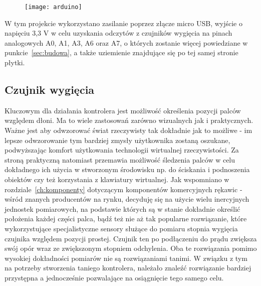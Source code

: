 \begin{figure}[h]
\centering
\texttt{[image: arduino]}
\label{fig:arduino}
\end{figure}

	W tym projekcie wykorzystano zasilanie poprzez złącze micro USB, wyjście o napięciu 3,3 V w celu uzyskania odczytów z czujników wygięcia na pinach analogowych A0, A1, A3, A6 oraz A7, o których zostanie więcej powiedziane w punkcie~\ref{sec:budowa}, a także uziemienie znajdujące się po tej samej stronie płytki.

	\subsection{Czujnik wygięcia}
	\label{subsec:wygiecie}	
	Kluczowym dla działania kontrolera jest możliwość określenia pozycji palców względem dłoni. Ma to wiele zastosowań zarówno wizualnych jak i praktycznych. Ważne jest aby odwzorować świat rzeczywisty tak dokładnie jak to możliwe - im lepsze odwzorowanie tym bardziej zmysły użytkownika zostaną oszukane, podwyższając komfort użytkowania technologii wirtualnej rzeczywistości. Za stroną praktyczną natomiast przemawia możliwość śledzenia palców w celu dokładnego ich użycia w stworzonym środowisku np. do ściskania i podnoszenia obiektów czy też korzystania z klawiatury wirtualnej. Jak wspomniano w rozdziale~\ref{ch:komponenty} dotyczącym komponentów komercyjnych rękawic - wśród znanych producentów na rynku, decyduję się na użycie wielu inercyjnych jednostek pomiarowych, na podstawie których są w stanie dokładnie określić położenia każdej części palca, bądź też nie aż tak popularne rozwiązanie, które wykorzystujące specjalistyczne sensory służące do pomiaru stopnia wygięcia czujnika względem pozycji prostej.
Czujnik ten po podłączeniu do prądu zwiększa swój opór wraz ze zwiększonym stopniem odchylenia. Oba te rozwiązania pomimo wysokiej dokładności pomiarów nie są rozwiązaniami tanimi. W związku z tym na potrzeby stworzenia taniego kontrolera, należało znaleźć rozwiązanie bardziej przystępna a jednocześnie pozwalające na osiągnięcie tego samego celu.
	
